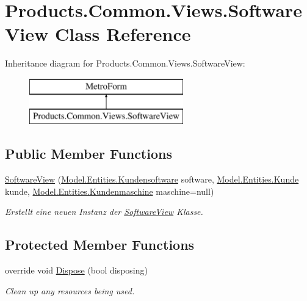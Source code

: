 \hypertarget{class_products_1_1_common_1_1_views_1_1_software_view}{}\section{Products.\+Common.\+Views.\+Software\+View Class Reference}
\label{class_products_1_1_common_1_1_views_1_1_software_view}
Inheritance diagram for Products.\+Common.\+Views.\+Software\+View\+:\begin{figure}[H]
\begin{center}
\leavevmode
\includegraphics[height=2.000000cm]{class_products_1_1_common_1_1_views_1_1_software_view}
\end{center}
\end{figure}
\subsection*{Public Member Functions}
\begin{DoxyCompactItemize}
\item 
\hyperlink{class_products_1_1_common_1_1_views_1_1_software_view_ac9e730d4a305948b3923685d2a44d8a5}{Software\+View} (\hyperlink{class_products_1_1_model_1_1_entities_1_1_kundensoftware}{Model.\+Entities.\+Kundensoftware} software, \hyperlink{class_products_1_1_model_1_1_entities_1_1_kunde}{Model.\+Entities.\+Kunde} kunde, \hyperlink{class_products_1_1_model_1_1_entities_1_1_kundenmaschine}{Model.\+Entities.\+Kundenmaschine} maschine=null)
\begin{DoxyCompactList}\small\item\em Erstellt eine neuen Instanz der \hyperlink{class_products_1_1_common_1_1_views_1_1_software_view}{Software\+View} Klasse. \end{DoxyCompactList}\end{DoxyCompactItemize}
\subsection*{Protected Member Functions}
\begin{DoxyCompactItemize}
\item 
override void \hyperlink{class_products_1_1_common_1_1_views_1_1_software_view_afa4be18c41728946fa0a2488e2dba1dd}{Dispose} (bool disposing)
\begin{DoxyCompactList}\small\item\em Clean up any resources being used. \end{DoxyCompactList}\end{DoxyCompactItemize}


